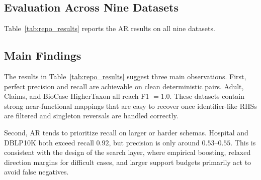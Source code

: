 \documentclass[conference]{IEEEtran}
\begin{document}
\subsection{Evaluation Across Nine Datasets}

Table~\ref{tab:repo_results} reports the AR results on all nine datasets.

\begin{table}[t]
\caption{AR Results Across Nine Datasets}
\label{tab:repo_results}
\centering
\scriptsize
{}
\end{table}

\subsection{Main Findings}

The results in Table~\ref{tab:repo_results} suggest three main observations. First, perfect precision and recall are achievable on clean deterministic pairs. Adult, Claims, and BioCase HigherTaxon all reach F1 $=1.0$. These datasets contain strong near-functional mappings that are easy to recover once identifier-like RHSs are filtered and singleton reversals are handled correctly.

Second, AR tends to prioritize recall on larger or harder schemas. Hospital and DBLP10K both exceed recall $0.92$, but precision is only around $0.53$--$0.55$. This is consistent with the design of the search layer, where empirical boosting, relaxed direction margins for difficult cases, and larger support budgets primarily act to avoid false negatives.
\end{document}
